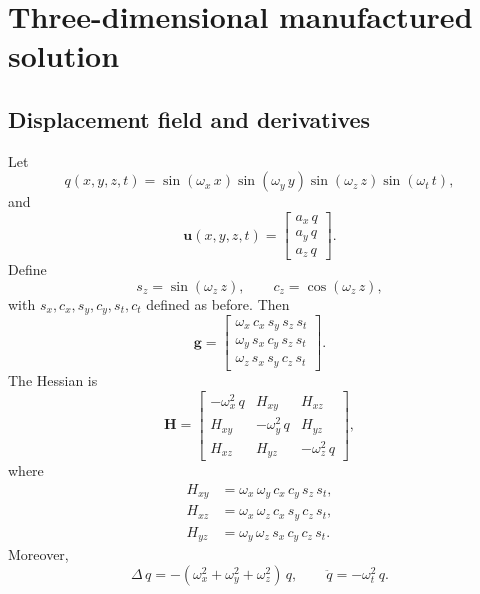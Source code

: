\documentclass[11pt,a4paper]{article}
\begin{document}
\section{Three-dimensional manufactured solution}

\subsection{Displacement field and derivatives}

Let
%
\begin{equation}
q(x,y,z,t)=
\sin(\omega_x\,x)\sin(\omega_y\,y)\sin(\omega_z\,z)\sin(\omega_t\,t),
\end{equation}
%
and
%
\begin{equation}
\boxed{
\textbf{u}(x,y,z,t)=
\begin{bmatrix}a_x\,q\\a_y\,q\\a_z\,q\end{bmatrix}
}.
\label{eq_u3D}
\end{equation}
%
Define
%
\begin{equation}
s_z=\sin(\omega_z\,z),\qquad c_z=\cos(\omega_z\,z),
\end{equation}
%
with $s_x,c_x,s_y,c_y,s_t,c_t$ defined as before. Then
%
\begin{equation}
\boxed{
\textbf{g}=
\begin{bmatrix}
\omega_x\,c_x\,s_y\,s_z\,s_t\\
\omega_y\,s_x\,c_y\,s_z\,s_t\\
\omega_z\,s_x\,s_y\,c_z\,s_t
\end{bmatrix}
}.
\label{eq_g3D}
\end{equation}
%
The Hessian is
%
\begin{equation}
\boxed{
\textbf{H}=
\begin{bmatrix}
-\omega_x^2\,q&H_{xy}&H_{xz}\\
H_{xy}&-\omega_y^2\,q&H_{yz}\\
H_{xz}&H_{yz}&-\omega_z^2\,q
\end{bmatrix}
},
\label{eq_H3D}
\end{equation}
%
where
%
\begin{align}
H_{xy}&=\omega_x\,\omega_y\,c_x\,c_y\,s_z\,s_t,\\
H_{xz}&=\omega_x\,\omega_z\,c_x\,s_y\,c_z\,s_t,\\
H_{yz}&=\omega_y\,\omega_z\,s_x\,c_y\,c_z\,s_t.
\end{align}
%
Moreover,
%
\begin{equation}
\boxed{
\Delta\, q=-(\omega_x^2+\omega_y^2+\omega_z^2)\,q,
\qquad
\ddot q=-\omega_t^2\,q
}.
\label{eq_qDeriv3D}
\end{equation}
\end{document}
